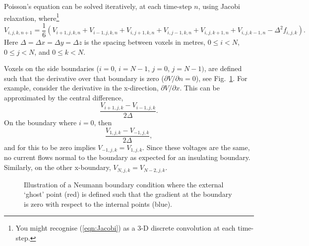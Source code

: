 \documentclass[a4paper,11pt]{article}
\begin{document}
Poisson's equation can be solved iteratively, at each time-step $n$,
using Jacobi relaxation, where\footnote{You might recognise
  (\ref{eqn:Jacobi}) as a 3-D discrete convolution at each time-step.}
%
\begin{equation}
  V_{i,j,k,n+1} = \frac{1}{6} \left(V_{i+1,j,k,n} + V_{i-1,j,k,n} + V_{i,j+1,k,n} + V_{i,j-1,k,n} + V_{i,j,k+1,n} + V_{i,j,k-1,n} - \Delta^2 f_{i,j,k}\right).
\label{eqn:Jacobi}
\end{equation}
%
Here $\Delta = \Delta x = \Delta y = \Delta z$ is the spacing between
voxels in metres, $0 \le i < N$, $0 \le j < N$, and $0 \le k < N$.

Voxels on the side boundaries ($i = 0$, $i=N-1$, $j = 0$, $j=N - 1)$,
are defined such that the derivative over that boundary is zero
($\partial V / \partial n = 0$), see Fig.~\ref{fig:Boundary}.  For
example, consider the derivative in the x-direction, $\partial V /
\partial x$.  This can be approximated by the central difference,
%
\begin{equation}
  \frac{V_{i+1,j,k} - V_{i-1,j,k}}{2\Delta}.
\end{equation}
%
On the boundary where $i=0$, then
%
\begin{equation}
  \frac{V_{1,j,k} - V_{-1,j,k}}{2\Delta},
\end{equation}
%
and for this to be zero implies $V_{-1,j,k} = V_{1,j,k}$.  Since these
voltages are the same, no current flows normal to the boundary as
expected for an insulating boundary.  Similarly, on the other
x-boundary, $V_{N,j,k} = V_{N-2,j,k}$.


\begin{figure}
  \centering
  \caption{Illustration of a Neumann boundary condition where the external
  `ghost' point (red) is defined such that the gradient at the boundary is zero
  with respect to the internal points (blue).}
  \label{fig:Boundary}
\end{figure}
\end{document}
